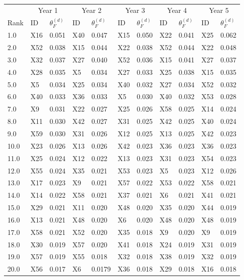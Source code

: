 \begin{table}[h]
\begin{center}
\begin{tabular}{|l||l l|l l|l l|l l|l l|}
 \hline
     & \multicolumn{2}{c}{Year 1} &
    \multicolumn{2}{c}{Year 2} &
    \multicolumn{2}{c}{Year 3} &
    \multicolumn{2}{c}{Year 4} &
    \multicolumn{2}{c}{Year 5} \\

    Rank 
    & ID & $\theta_{F}^{(d)}$
    & ID & $\theta_{F}^{(d)}$
    & ID & $\theta_{F}^{(d)}$
    & ID & $\theta_{F}^{(d)}$
    & ID & $\theta_{F}^{(d)}$ 
      \\ [0.5ex] 
 \hline\hline
    1.0 & X16 & 0.051 & X40 & 0.047 & X15 & 0.050 & X22 & 0.041 & X25 & 0.062 \\ \hline
    2.0 & X52 & 0.038 & X15 & 0.044 & X22 & 0.038 & X52 & 0.044 & X22 & 0.048 \\ \hline
    3.0 & X32 & 0.037 & X27 & 0.040 & X52 & 0.036 & X15 & 0.041 & X27 & 0.037 \\ \hline
    4.0 & X28 & 0.035 & X5 & 0.034 & X27 & 0.033 & X25 & 0.038 & X15 & 0.035 \\ \hline
    5.0 & X5 & 0.034 & X25 & 0.034 & X40 & 0.032 & X27 & 0.034 & X52 & 0.032 \\ \hline
    6.0 & X40 & 0.033 & X36 & 0.033 & X5 & 0.030 & X40 & 0.032 & X53 & 0.028 \\ \hline
    7.0 & X9 & 0.031 & X22 & 0.027 & X25 & 0.026 & X58 & 0.025 & X14 & 0.024 \\ \hline
    8.0 & X11 & 0.030 & X42 & 0.027 & X31 & 0.025 & X42 & 0.025 & X40 & 0.024 \\ \hline
    9.0 & X59 & 0.030 & X31 & 0.026 & X12 & 0.025 & X13 & 0.025 & X42 & 0.023 \\ \hline
    10.0 & X23 & 0.026 & X13 & 0.026 & X42 & 0.023 & X36 & 0.023 & X36 & 0.023 \\ \hline
    11.0 & X25 & 0.024 & X12 & 0.022 & X13 & 0.023 & X31 & 0.023 & X54 & 0.023 \\ \hline
    12.0 & X55 & 0.024 & X35 & 0.021 & X53 & 0.023 & X5 & 0.023 & X12 & 0.026 \\ \hline
    13.0 & X17 & 0.023 & X9 & 0.021 & X57 & 0.022 & X53 & 0.022 & X58 & 0.021 \\ \hline
    14.0 & X14 & 0.022 & X58 & 0.021 & X37 & 0.021 & X6 & 0.021 & X41 & 0.021 \\ \hline
    15.0 & X29 & 0.021 & X11 & 0.020 & X48 & 0.020 & X35 & 0.020 & X44 & 0.019 \\ \hline
    16.0 & X13 & 0.021 & X48 & 0.020 & X6 & 0.020 & X48 & 0.020 & X48 & 0.019 \\ \hline
    17.0 & X58 & 0.021 & X52 & 0.020 & X35 & 0.018 & X9 & 0.020 & X9 & 0.019 \\ \hline
    18.0 & X30 & 0.019 & X57 & 0.020 & X41 & 0.018 & X24 & 0.019 & X31 & 0.019 \\ \hline
    19.0 & X57 & 0.019 & X55 & 0.018 & X32 & 0.018 & X38 & 0.019 & X32 & 0.019 \\ \hline
    20.0 & X56 & 0.017 & X6 & 0.0179 & X36 & 0.018 & X29 & 0.018 & X16 & 0.018 \\ \hline


\end{tabular}
\end{center}
\end{table}
